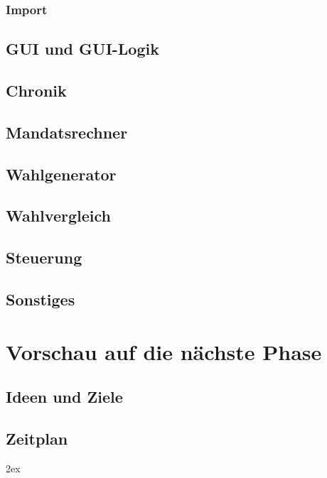 \documentclass[12pt,a4paper,titlepage]{article}
\begin{document}
		\subsubsection{Import}
	\subsection{GUI und GUI-Logik}	
	
	\subsection{Chronik}
	
	\subsection{Mandatsrechner}
	
	\subsection{Wahlgenerator}
	
	\subsection{Wahlvergleich}
	
	\subsection{Steuerung}
	
	\subsection{Sonstiges}

\section{Vorschau auf die nächste Phase}

	\subsection{Ideen und Ziele}

	\subsection{Zeitplan}
	
\begingroup
\parindent 0pt
\parskip 2ex
\def\enotesize{\normalsize}

\endgroup
\end{document}
